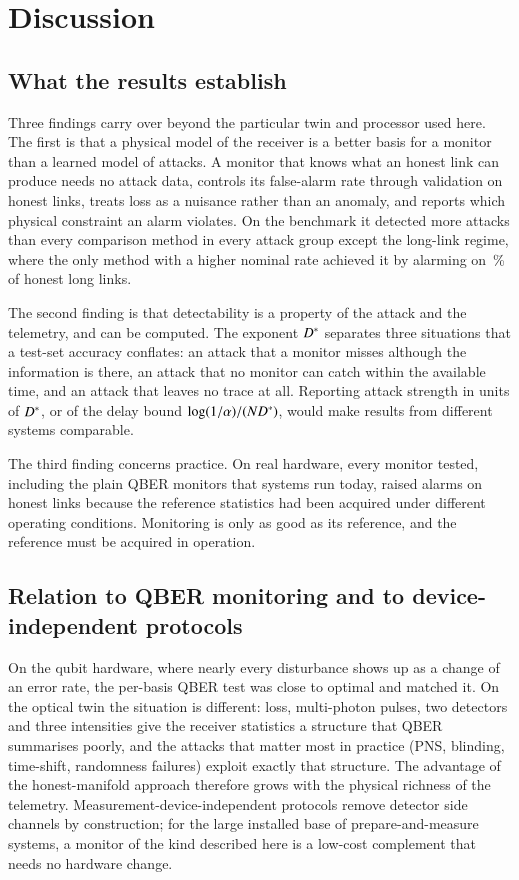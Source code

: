 \section{Discussion}\label{sec:discussion}

\subsection{What the results establish}

Three findings carry over beyond the particular twin and processor used here. The first is that a physical model of the receiver is a better basis for a monitor than a learned model of attacks. A monitor that knows what an honest link can produce needs no attack data, controls its false-alarm rate through validation on honest links, treats loss as a nuisance rather than an anomaly, and reports which physical constraint an alarm violates. On the benchmark it detected more attacks than every comparison method in every attack group except the long-link regime, where the only method with a higher nominal rate achieved it by alarming on \FALongQBERstatic\,\% of honest long links.

The second finding is that detectability is a property of the attack and the telemetry, and can be computed. The exponent $D^{\ast}$ separates three situations that a test-set accuracy conflates: an attack that a monitor misses although the information is there, an attack that no monitor can catch within the available time, and an attack that leaves no trace at all. Reporting attack strength in units of $D^{\ast}$, or of the delay bound $\log(1/\alpha)/(ND^{\ast})$, would make results from different systems comparable.

The third finding concerns practice. On real hardware, every monitor tested, including the plain QBER monitors that systems run today, raised alarms on honest links because the reference statistics had been acquired under different operating conditions. Monitoring is only as good as its reference, and the reference must be acquired in operation.

\subsection{Relation to QBER monitoring and to device-independent protocols}

On the qubit hardware, where nearly every disturbance shows up as a change of an error rate, the per-basis QBER test was close to optimal and \qtrace{} matched it. On the optical twin the situation is different: loss, multi-photon pulses, two detectors and three intensities give the receiver statistics a structure that QBER summarises poorly, and the attacks that matter most in practice (PNS, blinding, time-shift, randomness failures) exploit exactly that structure. The advantage of the honest-manifold approach therefore grows with the physical richness of the telemetry. Measurement-device-independent protocols \cite{LoCurtyQi2012} remove detector side channels by construction; for the large installed base of prepare-and-measure systems, a monitor of the kind described here is a low-cost complement that needs no hardware change.

